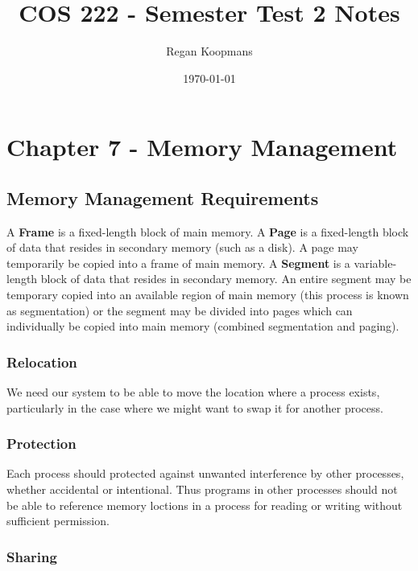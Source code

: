 \documentclass[11pt]{article}
\author{Regan Koopmans}
\date{\today}
\title{COS 222 - Semester Test 2 Notes}
\begin{document}
\maketitle
\tableofcontents


\section{Chapter 7 - Memory Management}
\label{sec:orgheadline29}

\subsection{Memory Management Requirements}
\label{sec:orgheadline6}

A \textbf{Frame} is a fixed-length block of main memory.
A \textbf{Page} is a fixed-length block of data that resides in
secondary memory (such as a disk). A page may temporarily
be copied into a frame of main memory.
A \textbf{Segment} is a variable-length block of data that resides
in secondary memory. An entire segment may be temporary
copied into an available region of main memory (this process
is known as segmentation) or the segment may be divided into
pages which can individually be copied into main memory
(combined segmentation and paging).

\subsubsection{Relocation}
\label{sec:orgheadline1}

We need our system to be able to move the location where a
process exists, particularly in the case where we might want
to swap it for another process.

\subsubsection{Protection}
\label{sec:orgheadline2}

Each process should protected against unwanted interference
by other processes, whether accidental or intentional. Thus
programs in other processes should not be able to reference
memory loctions in a process for reading or writing without
sufficient permission.

\subsubsection{Sharing}
\label{sec:orgheadline3}
\end{document}
